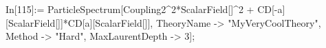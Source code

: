 In[115]:= ParticleSpectrum[Coupling2^2*ScalarField[]^2 + CD[-a][ScalarField[]]*CD[a][ScalarField[]], TheoryName -> "MyVeryCoolTheory", Method -> "Hard", MaxLaurentDepth -> 3]; 